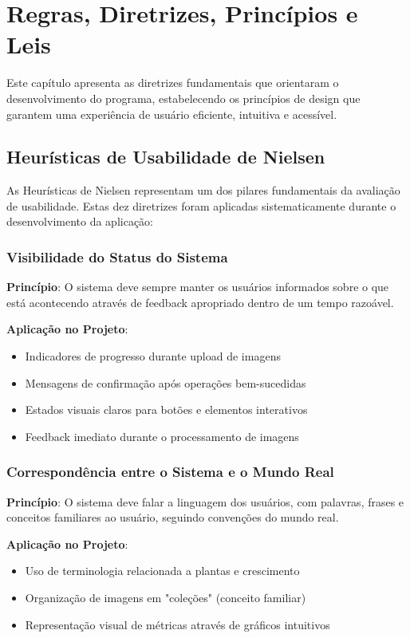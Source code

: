 \chapter{Regras, Diretrizes, Princípios e Leis}

Este capítulo apresenta as diretrizes fundamentais que orientaram o desenvolvimento do programa, estabelecendo os princípios de design que garantem uma experiência de usuário eficiente, intuitiva e acessível.

\section{Heurísticas de Usabilidade de Nielsen}

As Heurísticas de Nielsen representam um dos pilares fundamentais da avaliação de usabilidade. Estas dez diretrizes foram aplicadas sistematicamente durante o desenvolvimento da aplicação:

\subsection{Visibilidade do Status do Sistema}

\textbf{Princípio}: O sistema deve sempre manter os usuários informados sobre o que está acontecendo através de feedback apropriado dentro de um tempo razoável.

\textbf{Aplicação no Projeto}:
\begin{itemize}
    \item Indicadores de progresso durante upload de imagens
    \item Mensagens de confirmação após operações bem-sucedidas
    \item Estados visuais claros para botões e elementos interativos
    \item Feedback imediato durante o processamento de imagens
\end{itemize}

\subsection{Correspondência entre o Sistema e o Mundo Real}

\textbf{Princípio}: O sistema deve falar a linguagem dos usuários, com palavras, frases e conceitos familiares ao usuário, seguindo convenções do mundo real.

\textbf{Aplicação no Projeto}:
\begin{itemize}
    \item Uso de terminologia relacionada a plantas e crescimento
    \item Organização de imagens em "coleções" (conceito familiar)
    \item Representação visual de métricas através de gráficos intuitivos
\end{itemize}

